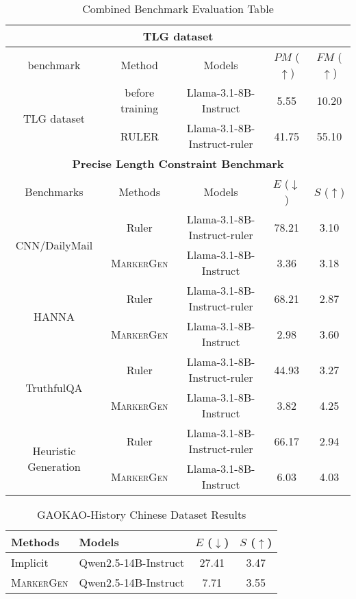 \begin{table*}[ht]
  \centering
  \small
  \setlength{\tabcolsep}{1.30em} 
\renewcommand{\arraystretch}{1.00}
\begin{tabular}{ccccc}
\toprule
\multicolumn{5}{c}{\textbf{TLG dataset}} \\
\midrule
benchmark & Method & Models & $PM$ ($\uparrow$) & $FM$ ($\uparrow$)\\
\midrule
\multirow{2}{*}{TLG dataset} 
& before training & Llama-3.1-8B-Instruct & 5.55 & 10.20  \\
& RULER &Llama-3.1-8B-Instruct-ruler & 41.75 & 55.10  \\
\midrule
\multicolumn{5}{c}{\textbf{Precise Length Constraint Benchmark }} \\
\midrule
Benchmarks & Methods & Models &  $E$ ($\downarrow$)  & $S$ ($\uparrow$)\\
\midrule
\multirow{2}{*}{CNN/DailyMail}  
& Ruler & Llama-3.1-8B-Instruct-ruler & 78.21 & 3.10  \\
& \textsc{MarkerGen} & Llama-3.1-8B-Instruct & 3.36 & 3.18 \\
\midrule
\multirow{2}{*}{HANNA}  
& Ruler & Llama-3.1-8B-Instruct-ruler & 68.21 & 2.87 \\
& \textsc{MarkerGen} & Llama-3.1-8B-Instruct & 2.98 & 3.60 \\
\midrule
\multirow{2}{*}{TruthfulQA}  
& Ruler & Llama-3.1-8B-Instruct-ruler & 44.93 & 3.27 \\
& \textsc{MarkerGen} & Llama-3.1-8B-Instruct & 3.82 & 4.25 \\
\midrule
\multirow{2}{*}{Heuristic Generation}   
& Ruler & Llama-3.1-8B-Instruct-ruler & 66.17 & 2.94 \\
& \textsc{MarkerGen} & Llama-3.1-8B-Instruct & 6.03 & 4.03 \\
\bottomrule
\end{tabular}
\caption{\label{tab:ruler_results}Combined Benchmark Evaluation Table}
\end{table*}

\begin{table}[ht]
\centering
    \small
   \renewcommand\arraystretch{1.2}
  \setlength{\tabcolsep}{0.6em} 
\begin{tabular}{l l c c}
\toprule
\textbf{Methods} & \textbf{Models} & $E$ ($\downarrow$) & $S$ ($\uparrow$)\\
\midrule
Implicit & Qwen2.5-14B-Instruct& 27.41 & 3.47 \\
\textsc{MarkerGen} & Qwen2.5-14B-Instruct & 7.71 &3.55  \\
\bottomrule
\end{tabular}
\caption{GAOKAO-History Chinese Dataset Results}
\label{tab:chinese}
\end{table}

